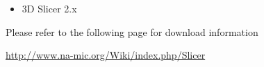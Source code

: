 \documentclass{InsightArticle}
\begin{document}
\begin{itemize}
  \item  3D Slicer 2.x
\end{itemize}

Please refer to the following page for download information

\url{http://www.na-mic.org/Wiki/index.php/Slicer}




%
%



\end{document}
